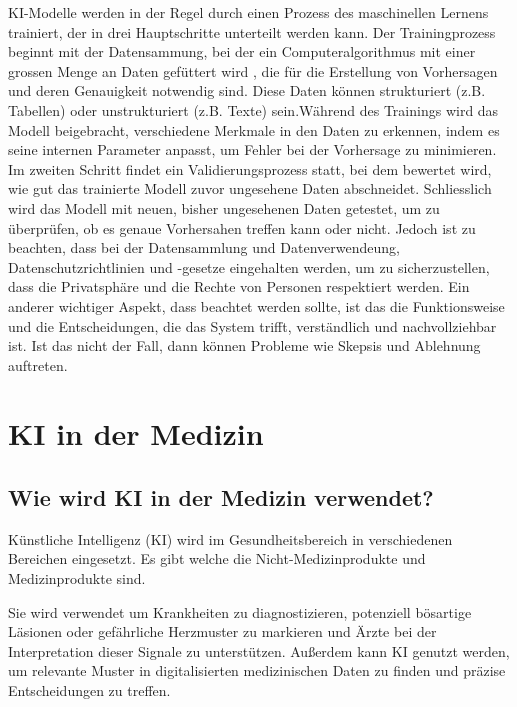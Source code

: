 \documentclass{article}
\begin{document}
KI-Modelle werden in der Regel durch einen Prozess des maschinellen Lernens trainiert, der in drei Hauptschritte unterteilt werden kann.  Der Trainingprozess beginnt mit der Datensammung, bei der ein Computeralgorithmus mit einer grossen Menge an Daten gefüttert wird , die für die Erstellung von Vorhersagen und deren Genauigkeit notwendig sind. Diese Daten können strukturiert (z.B. Tabellen) oder unstrukturiert (z.B. Texte) sein.Während des Trainings wird das Modell beigebracht, verschiedene Merkmale in den Daten zu erkennen, indem es seine internen Parameter anpasst, um Fehler bei der Vorhersage zu minimieren. Im zweiten Schritt findet ein Validierungsprozess statt, bei dem bewertet wird, wie gut das trainierte Modell zuvor ungesehene Daten abschneidet. Schliesslich wird das Modell mit neuen, bisher ungesehenen Daten getestet, um zu überprüfen, ob es genaue Vorhersahen treffen kann oder nicht. 
\citep{clickworker}
\newline
Jedoch ist zu beachten, dass bei der Datensammlung und Datenverwendeung, Datenschutzrichtlinien und -gesetze eingehalten werden, um zu sicherzustellen, dass die Privatsphäre und die Rechte von Personen respektiert werden. Ein anderer wichtiger Aspekt, dass beachtet werden sollte, ist das die Funktionsweise und die Entscheidungen, die das System trifft, verständlich und nachvollziehbar ist. Ist das nicht der Fall, dann können Probleme wie Skepsis und Ablehnung auftreten. 


\section{KI in der Medizin}


\subsection{Wie wird KI in der Medizin verwendet?}

Künstliche Intelligenz (KI) wird im Gesundheitsbereich in verschiedenen Bereichen 
eingesetzt. Es gibt welche die Nicht-Medizinprodukte und Medizinprodukte sind. 



Sie wird verwendet um Krankheiten zu diagnostizieren, potenziell bösartige Läsionen oder 
gefährliche Herzmuster zu markieren und Ärzte bei der Interpretation dieser Signale zu unterstützen. 
Außerdem kann KI genutzt werden, um relevante Muster in digitalisierten medizinischen 
Daten zu finden und präzise Entscheidungen zu treffen. 
\end{document}
